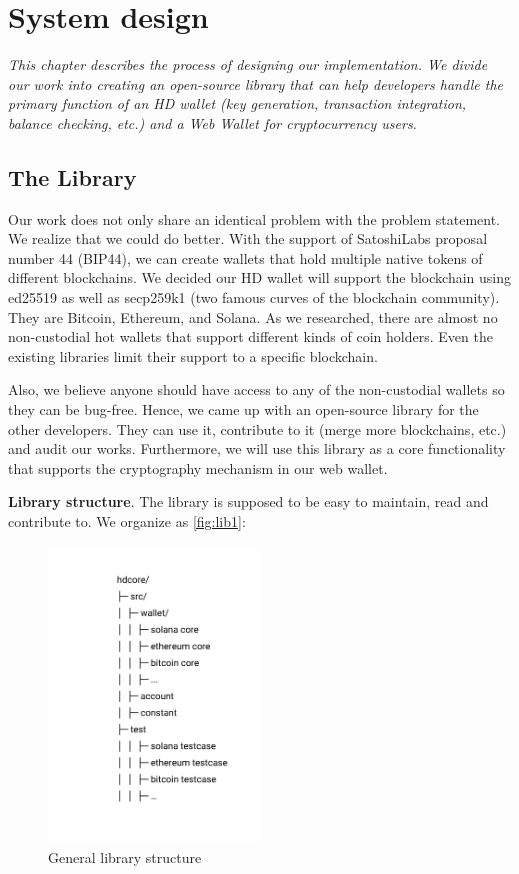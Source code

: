 \chapter{System design} \label{chap:System_desgin}
\textit{This chapter describes the process of designing our implementation. We divide our work into creating an open-source library that can help developers handle the primary function of an HD wallet (key generation, transaction integration, balance checking, etc.) and a Web Wallet for cryptocurrency users. }

\minitoc

\section{The Library}
Our work does not only share an identical problem with the problem statement. We realize that we could do better. With the support of SatoshiLabs proposal number 44 (BIP44), we can create wallets that hold multiple native tokens of different blockchains. We decided our HD wallet will support the blockchain using ed25519 as well as secp259k1 (two famous curves of the blockchain community). They are Bitcoin, Ethereum, and Solana. As we researched, there are almost no non-custodial hot wallets that support different kinds of coin holders. Even the existing libraries limit their support to a specific blockchain.

Also, we believe anyone should have access to any of the non-custodial wallets so they can be bug-free. Hence, we came up with an open-source library for the other developers. They can use it, contribute to it (merge more blockchains, etc.) and audit our works. Furthermore, we will use this library as a core functionality that supports the cryptography mechanism in our web wallet.

\bigskip
{\textbf{Library structure}}. The library is supposed to be easy to maintain, read and contribute to. We organize as \autoref{fig:lib1}:

\begin{figure}[!ht]
    \centering
    \includegraphics[width=0.5\textwidth]{images/lib_struct.png}
    \caption[General library structure]{General library structure}
    \label{fig:lib1}
\end{figure}

